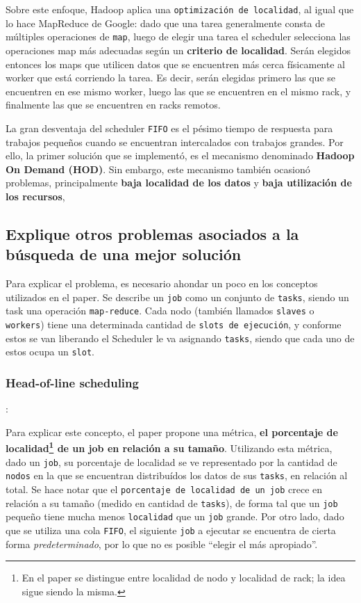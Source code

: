 \documentclass[11pt, a4paper, twoside]{article}
\begin{document}
Sobre este enfoque, Hadoop aplica una \texttt{optimización de localidad}, al
igual que lo hace MapReduce de Google: dado que una tarea generalmente consta de
múltiples operaciones de \texttt{map}, luego de elegir una tarea el scheduler
selecciona las operaciones map más adecuadas según un \textbf{criterio de
localidad}. Serán elegidos entonces los maps que utilicen datos que se
encuentren más cerca físicamente al worker que está corriendo la tarea. Es
decir, serán elegidas primero las que se encuentren en ese mismo worker, luego
las que se encuentren en el mismo rack, y finalmente las que se encuentren en
racks remotos.

La gran desventaja del scheduler \texttt{FIFO} es el pésimo tiempo de respuesta
para trabajos pequeños cuando se encuentran intercalados con trabajos grandes.
Por ello, la primer solución que se implementó, es el mecanismo denominado
\textbf{Hadoop On Demand (HOD)}. Sin embargo, este mecanismo también ocasionó
problemas, principalmente \textbf{baja localidad de los datos} y \textbf{baja
utilización de los recursos},

\clearpage
\subsection {\footnotesize Explique otros problemas asociados a la búsqueda de una mejor solución}
\label{investigacion-5}

Para explicar el problema, es necesario ahondar un poco en los conceptos
utilizados en el paper. Se describe un \texttt{job} como un conjunto de
\texttt{tasks}, siendo un task una operación \texttt{map-reduce}. Cada nodo
(también llamados \texttt{slaves} o \texttt{workers}) tiene una determinada
cantidad de \texttt{slots de ejecución}, y conforme estos se van liberando el
Scheduler le va asignando \texttt{tasks}, siendo que cada uno de estos ocupa
un \texttt{slot}.



\subsubsection{Head-of-line scheduling}: 

Para explicar este concepto, el paper propone
una métrica, \textbf{el porcentaje de localidad\footnote{En el paper se
distingue entre localidad de nodo y localidad de rack; la idea sigue siendo la
misma.} de un job en relación a su tamaño}. Utilizando esta métrica, dado un
\texttt{job}, su porcentaje de localidad se ve representado por la cantidad de
\texttt{nodos} en la que se encuentran distribuídos los datos de sus
\texttt{tasks}, en relación al total. Se hace notar que el \texttt{porcentaje
de localidad de un job} crece en relación a su tamaño (medido en cantidad de
\texttt{tasks}), de forma tal que un \texttt{job} pequeño tiene mucha menos
\texttt{localidad} que un \texttt{job} grande. Por otro lado, dado que se
utiliza una cola \texttt{FIFO}, el siguiente \texttt{job} a ejecutar se
encuentra de cierta forma \emph{predeterminado}, por lo que no es posible
``elegir el más apropiado''.
\end{document}
